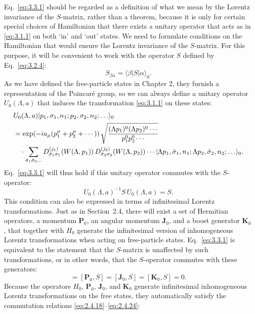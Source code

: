 Eq.~\eqref{eq:3.3.1} should be regarded as a definition of what we mean by the Lorentz
invariance of the $S$-matrix, rather than a theorem, because it is only for certain
special choices of Hamiltonian that there exists a unitary operator that acts as
in \eqref{eq:3.1.1} on both `in' and `out' states. We need to formulate conditions on the
Hamiltonian that would ensure the Lorentz invariance of the $S$-matrix. For this
purpose, it will be convenient to work with the operator $S$ defined by
Eq.~\eqref{eq:3.2.4}:
\[
S_{\beta\alpha}=\langle\beta\vert S\vert\alpha\rangle_0.
\]
As we have defined the free-particle states in Chapter 2, they furnish a
representation of the Poincar\'e group, so we can always define a
unitary operator $U_0(\Lambda,a)$ that induces the transformation \eqref{eq:3.1.1} on
these states:
\begin{align*}
&U_0(\Lambda,a)\lvert p_1,\sigma_1,n_1;p_2,\sigma_2,n_2;\ldots\rangle_0
\nonumber\\
&=\exp\!\left(-ia_\mu(p_1^\mu+p_2^\mu+\cdots)\right)
\sqrt{\frac{(\Lambda p_1)^0(\Lambda p_2)^0\cdots}{p_1^0p_2^0\cdots}}
\nonumber\\
&\quad\cdot\sum_{\bar\sigma_1\bar\sigma_2\ldots}
D^{(j_1)}_{\bar\sigma_1\sigma_1}\!\left(W(\Lambda,p_1)\right)
D^{(j_2)}_{\bar\sigma_2\sigma_2}\!\left(W(\Lambda,p_2)\right)\cdots
\lvert \Lambda p_1,\bar\sigma_1,n_1;\Lambda p_2,\bar\sigma_2,n_2;\ldots\rangle_0.
\end{align*}
Eq.~\eqref{eq:3.3.1} will thus hold if this unitary operator commutes with the
$S$-operator:
\[
U_0(\Lambda,a)^{-1}S\,U_0(\Lambda,a)=S.
\]
This condition can also be expressed in terms of infinitesimal Lorentz
transformations. Just as in Section~2.4, there will exist a set of Hermitian
operators, a momentum $\mathbf{P}_0$, an angular momentum $\mathbf{J}_0$, and a
boost generator $\mathbf{K}_0$, that together with $H_0$ generate the infinitesimal
version of inhomogeneous Lorentz transformations when acting on free-particle
states. Eq.~\eqref{eq:3.3.1} is equivalent to the statement that the $S$-matrix is
unaffected by such transformations, or in other words, that the $S$-operator
commutes with these generators:
\begin{equation}
[H_0,S]=[\mathbf{P}_0,S]=[\mathbf{J}_0,S]=[\mathbf{K}_0,S]=0.
\tag{3.3.3}\label{eq:3.3.3}
\end{equation}
Because the operators $H_0$, $\mathbf{P}_0$, $\mathbf{J}_0$, and $\mathbf{K}_0$
generate infinitesimal inhomogeneous Lorentz transformations on the free states,
they automatically satisfy the commutation relations \eqref{eq:2.4.18}--\eqref{eq:2.4.24}:
